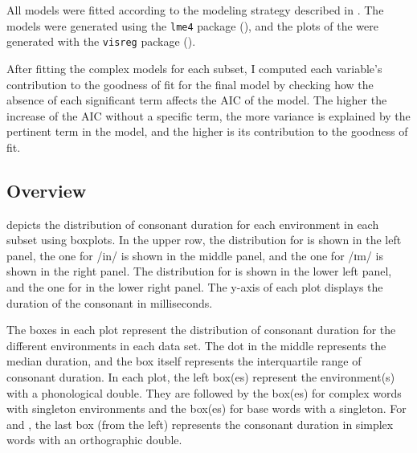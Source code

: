 All models were fitted according to the modeling strategy described in .  
The models were generated using the \texttt{lme4} package (\citealt{Bates.2014}), and the plots of the  were generated with the \texttt{visreg} package (\citealt{Breheny.2015}). 

After fitting the complex models for each subset, I computed each variable's contribution to the goodness of fit for the final model by checking how the absence of each significant term affects the AIC of the model. The higher the increase of the AIC without a specific term, the more variance is explained by the pertinent term in the model, and the higher is its contribution to the goodness of fit.

\subsection{Overview}
 depicts the distribution of consonant duration for each environment in each subset using boxplots. In the upper row, the distribution for  is shown in the left panel, the one for /in/
is shown in the middle panel, and the one for /ɪm/  is shown in the right panel. The distribution for  is shown in the lower left panel, and the one for  in the lower right panel.
The y-axis of each plot displays the duration of the consonant in milliseconds. 

The boxes in each plot represent the distribution of consonant duration for the different environments in each data set. The dot in the middle represents the median duration, and the box itself represents the interquartile range of consonant duration. 
In each plot, the left box(es) represent the environment(s) with a phonological double. They are followed by the box(es) for  complex words with singleton environments and the box(es) for base words with a singleton. For  and , the last box (from the left) represents the consonant duration in simplex words with an orthographic double.

